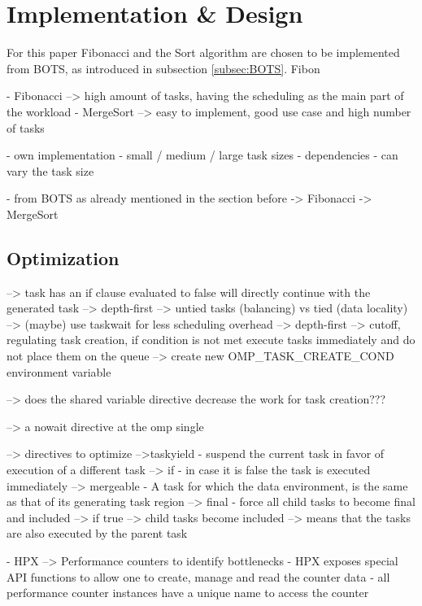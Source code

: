 \section{Implementation \& Design}
  For this paper Fibonacci and the Sort algorithm are chosen to be implemented from BOTS, as introduced in subsection \ref{subsec:BOTS}.
  Fibon

	- Fibonacci --> high amount of tasks, having the scheduling as the main part of the workload
	- MergeSort --> easy to implement, good use case and high number of tasks


- own implementation
  - small / medium / large task sizes
  - dependencies
  - can vary the task size
  
- from BOTS
	as already mentioned in the section before
	-> Fibonacci
	-> MergeSort
		
		
\subsection{Optimization}
	
	\cite{LaGrone.2011}
	--> task has an if clause evaluated to false will directly continue with the generated task --> depth-first
	--> untied tasks (balancing) vs tied (data locality)
	--> (maybe) use taskwait for less scheduling overhead --> depth-first
	--> cutoff, regulating task creation, if condition is not met execute tasks immediately and do not place them on the queue
		--> create new OMP\_TASK\_CREATE\_COND environment variable
		
    --> does the shared variable directive decrease the work for task creation???
    
    --> a nowait directive at the omp single
    
    \cite{MKlemm.2018}
 --> directives to optimize
 	-->taskyield - suspend the current task in favor of execution of a different task
 	--> if - in case it is false the task is executed immediately
 	--> mergeable - A task for which the data environment, is the same as that of its generating task region
 	--> final - force all child tasks to become final and included
 		--> if true --> child tasks become included --> means that the tasks are also executed by the parent task


  \cite{TheSTEARGroup.15.01.2020}
    - HPX --> Performance counters to identify bottlenecks
    - HPX exposes special API functions to allow one to create, manage and read the counter data
    - all performance counter instances have a unique name to access the counter